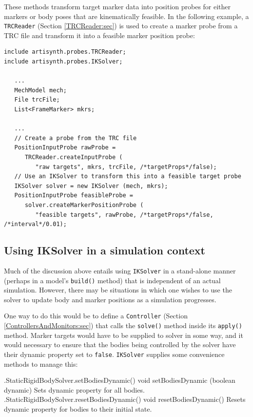 These methods transform target marker data into position probes for either
markers or body poses that are kinematically feasible.  In the following
example, a {\tt TRCReader} (Section \ref{TRCReader:sec}) is used to create a
marker probe from a TRC file and transform it into a feasible marker position
probe:
%
\begin{lstlisting}[]
include artisynth.probes.TRCReader;
include artisynth.probes.IKSolver;

   ...
   MechModel mech;
   File trcFile;
   List<FrameMarker> mkrs;

   ...
   // Create a probe from the TRC file
   PositionInputProbe rawProbe =
      TRCReader.createInputProbe (
         "raw targets", mkrs, trcFile, /*targetProps*/false);
   // Use an IKSolver to transform this into a feasible target probe
   IKSolver solver = new IKSolver (mech, mkrs);
   PositionInputProbe feasibleProbe =
      solver.createMarkerPositionProbe (
         "feasible targets", rawProbe, /*targetProps*/false, /*interval*/0.01);
\end{lstlisting}
%

\subsection{Using IKSolver in a simulation context}

Much of the discussion above entails using {\tt IKSolver} in a stand-alone
manner (perhaps in a model's {\tt build()} method) that is independent of an
actual simulation. However, there may be situations in which one wishes to use
the solver to update body and marker positions as a simulation progresses.

One way to do this would be to define a {\tt Controller}
(Section \ref{ControllersAndMonitors:sec}) that calls the {\tt solve()} method
inside its {\tt apply()} method. Marker targets would have to be supplied to
solver in some way, and it would necessary to ensure that the bodies being
controlled by the solver have their {\sf dynamic} property set to {\tt false}.
{\tt IKSolver} supplies some convenience methods to manage this:

%
\begin{methodtable}{0.5}{0.5}
%
\methodentry
{\mech.StaticRigidBodySolver.setBodiesDynamic()}%
{void setBodiesDynamic (boolean dynamic)}%
{Sets dynamic property for all bodies.}%
%
\methodentry
{\mech.StaticRigidBodySolver.resetBodiesDynamic()}%
{void resetBodiesDynamic()}%
{Resets dynamic property for bodies to their initial state.}%
%
\end{methodtable}
%

